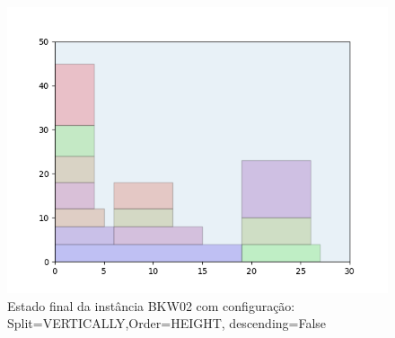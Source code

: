 \begin{figure}[H]
    \centering
    \caption[]{Estado final da instância BKW02 com configuração: Split=VERTICALLY,Order=HEIGHT, descending=False}
    \label{fig:bkw02-vertically-height-false}
    \includegraphics[scale=0.5]{output/figures/bkw/bkw02/vertically/height/false/00}
\end{figure}